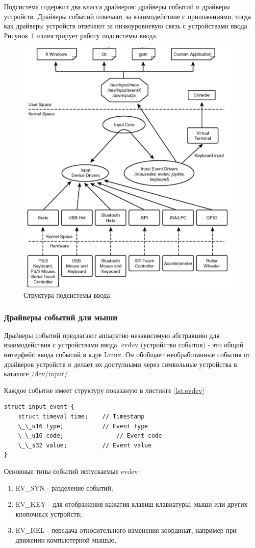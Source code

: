 Подсистема содержит два класса драйверов: драйверы событий и драйверы устройств. 
Драйверы событий отвечают за взаимодействие с приложениями, тогда как драйверы устройств отвечают за низкоуровневую связь с устройствами ввода. 
Рисунок \ref*{fig:inputsystem} иллюстрирует работу подсистемы ввода.

\begin{figure}[H]
	\centering
	\includegraphics[width=0.7\linewidth]{src/img/input_system}
	\caption{Структура подсистемы ввода}
	\label{fig:inputsystem}
\end{figure}

\subsubsection{Драйверы событий для мыши}
Драйверы событий предлагают аппаратно независимую абстракцию для взаимодействия с устройствами ввода.
evdev (устройство события) - это общий интерфейс ввода событий в ядре Linux. 
Он обобщает необработанные события от драйверов устройств и делает их доступными через символьные устройства в каталоге /dev/input/. 

Каждое событие имеет структуру показаную в листинге \ref{lst:evdev}

\begin{lstlisting}[caption=Структура события evdev, label=lst:evdev]
struct input_event {
	struct timeval time; 	// Timestamp
	\_\_u16 type; 			// Event type
	\_\_u16 code;				// Event code
	\_\_s32 value;			// Event value
}
\end{lstlisting}

Основные типы событий испускаемые evdev:
\begin{enumerate}
	\item EV\_SYN - разделение событий;
	\item EV\_KEY - для отображения нажатия клавиш клавиатуры, мыши или других кнопочных устройств;
	\item EV\_REL - передача относительного изменения координат, например при движении компьютерной мышью.
\end{enumerate}




